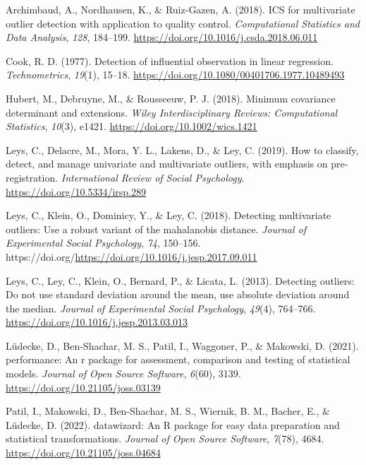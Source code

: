 \documentclass[
]{article}
\newlength{\cslhangindent}
\newlength{\cslentryspacingunit} %
\newenvironment{CSLReferences}[2] %
 {%
  \setlength{\parindent}{0pt}
  \ifodd #1
  \let\oldpar\par
  \def\par{\hangindent=\cslhangindent\oldpar}
  \fi
  \setlength{\parskip}{#2\cslentryspacingunit}
 }%
 {}
\begin{document}
\hypertarget{refs}{}
\begin{CSLReferences}{1}{0}
\leavevmode{}%
Archimbaud, A., Nordhausen, K., \& Ruiz-Gazen, A. (2018). ICS for multivariate outlier detection with application to quality control. \emph{Computational Statistics and Data Analysis}, \emph{128}, 184--199. \url{https://doi.org/10.1016/j.csda.2018.06.011}

\leavevmode{}%
Cook, R. D. (1977). Detection of influential observation in linear regression. \emph{Technometrics}, \emph{19}(1), 15--18. \url{https://doi.org/10.1080/00401706.1977.10489493}

\leavevmode{}%
Hubert, M., Debruyne, M., \& Rousseeuw, P. J. (2018). Minimum covariance determinant and extensions. \emph{Wiley Interdisciplinary Reviews: Computational Statistics}, \emph{10}(3), e1421. \url{https://doi.org/10.1002/wics.1421}

\leavevmode{}%
Leys, C., Delacre, M., Mora, Y. L., Lakens, D., \& Ley, C. (2019). How to classify, detect, and manage univariate and multivariate outliers, with emphasis on pre-registration. \emph{International Review of Social Psychology}. \url{https://doi.org/10.5334/irsp.289}

\leavevmode{}%
Leys, C., Klein, O., Dominicy, Y., \& Ley, C. (2018). Detecting multivariate outliers: Use a robust variant of the mahalanobis distance. \emph{Journal of Experimental Social Psychology}, \emph{74}, 150--156. https://doi.org/\url{https://doi.org/10.1016/j.jesp.2017.09.011}

\leavevmode{}%
Leys, C., Ley, C., Klein, O., Bernard, P., \& Licata, L. (2013). Detecting outliers: Do not use standard deviation around the mean, use absolute deviation around the median. \emph{Journal of Experimental Social Psychology}, \emph{49}(4), 764--766. \url{https://doi.org/10.1016/j.jesp.2013.03.013}

\leavevmode{}%
Lüdecke, D., Ben-Shachar, M. S., Patil, I., Waggoner, P., \& Makowski, D. (2021). {performance}: An r package for assessment, comparison and testing of statistical models. \emph{Journal of Open Source Software}, \emph{6}(60), 3139. \url{https://doi.org/10.21105/joss.03139}

\leavevmode{}%
Patil, I., Makowski, D., Ben-Shachar, M. S., Wiernik, B. M., Bacher, E., \& Lüdecke, D. (2022). {datawizard}: An {R} package for easy data preparation and statistical transformations. \emph{Journal of Open Source Software}, \emph{7}(78), 4684. \url{https://doi.org/10.21105/joss.04684}


\end{CSLReferences}
\end{document}
